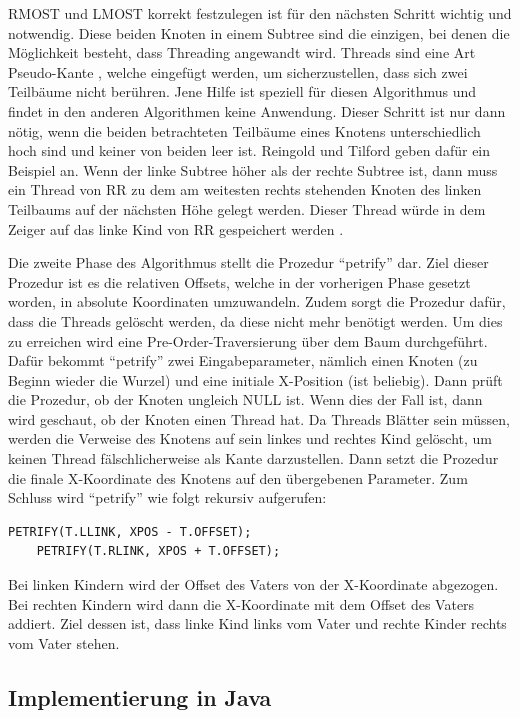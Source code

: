 RMOST und LMOST korrekt festzulegen ist für den nächsten Schritt wichtig und notwendig. Diese beiden Knoten in einem Subtree 
sind die einzigen, bei denen die Möglichkeit besteht, dass Threading angewandt wird. Threads sind eine Art \glqq Pseudo-Kante \grqq{}, 
welche eingefügt werden, um sicherzustellen, dass sich zwei Teilbäume nicht berühren. Jene Hilfe ist speziell für diesen Algorithmus
und findet in den anderen Algorithmen keine Anwendung. Dieser Schritt ist nur dann nötig, wenn 
die beiden betrachteten Teilbäume eines Knotens unterschiedlich hoch sind und keiner von beiden leer ist. Reingold und Tilford 
geben dafür ein Beispiel an. Wenn der linke Subtree höher als der rechte Subtree ist, dann muss ein Thread von \ac{RR} zu dem am weitesten 
rechts stehenden Knoten des linken Teilbaums auf der nächsten Höhe gelegt werden. Dieser Thread würde in dem Zeiger auf das linke Kind 
von \ac{RR} gespeichert werden \cite[S. 226]{q2}.

Die zweite Phase des Algorithmus stellt die Prozedur “petrify” dar. Ziel dieser Prozedur ist es die relativen Offsets, 
welche in der vorherigen Phase gesetzt worden, in absolute Koordinaten umzuwandeln. Zudem sorgt die Prozedur dafür, dass die Threads 
gelöscht werden, da diese nicht mehr benötigt werden. Um dies zu erreichen wird eine Pre-Order-Traversierung 
über dem Baum durchgeführt. Dafür bekommt “petrify” zwei Eingabeparameter, nämlich einen Knoten (zu Beginn wieder die Wurzel) und eine 
initiale X-Position (ist beliebig). Dann prüft die Prozedur, ob der Knoten ungleich NULL ist. Wenn dies der Fall ist, dann wird geschaut, 
ob der Knoten einen Thread hat. Da Threads Blätter sein müssen, werden die Verweise des Knotens auf sein linkes und rechtes Kind gelöscht, 
um keinen Thread fälschlicherweise als Kante darzustellen. Dann setzt die Prozedur die finale X-Koordinate des Knotens auf den 
übergebenen Parameter. Zum Schluss wird “petrify” wie folgt rekursiv aufgerufen:

\begin{lstlisting}[caption=Rekursiver Aufruf von Petrify (Pre-Order)]
    PETRIFY(T.LLINK, XPOS - T.OFFSET);
    PETRIFY(T.RLINK, XPOS + T.OFFSET);
\end{lstlisting}

Bei linken Kindern wird der Offset des Vaters von der X-Koordinate abgezogen. Bei rechten Kindern wird dann die X-Koordinate mit dem 
Offset des Vaters addiert. Ziel dessen ist, dass linke Kind links vom Vater und rechte Kinder rechts vom Vater stehen.


\subsection{Implementierung in Java}

